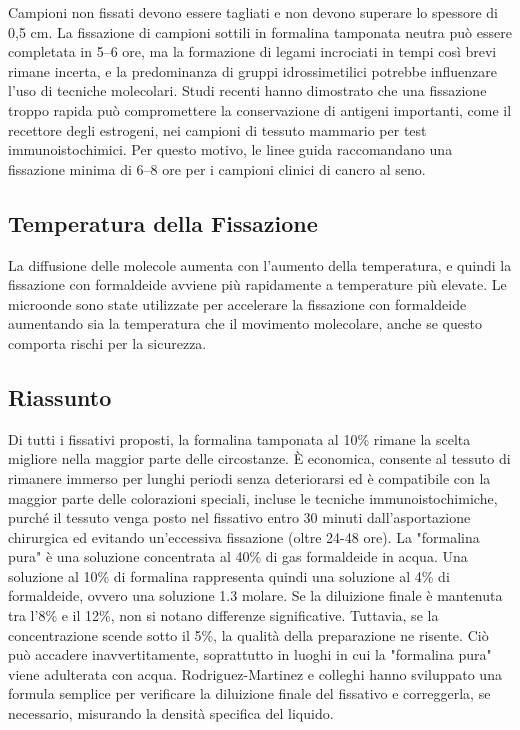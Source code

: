 Campioni non fissati devono essere tagliati e non devono superare lo spessore di 0,5 cm. La fissazione di campioni sottili in formalina tamponata neutra può essere completata in 5–6 ore, ma la formazione di legami incrociati in tempi così brevi rimane incerta, e la predominanza di gruppi idrossimetilici potrebbe influenzare l'uso di tecniche molecolari. Studi recenti hanno dimostrato che una fissazione troppo rapida può compromettere la conservazione di antigeni importanti, come il recettore degli estrogeni, nei campioni di tessuto mammario per test immunoistochimici. Per questo motivo, le linee guida raccomandano una fissazione minima di 6–8 ore per i campioni clinici di cancro al seno.

\subsection{Temperatura della Fissazione}
La diffusione delle molecole aumenta con l'aumento della temperatura, e quindi la fissazione con formaldeide avviene più rapidamente a temperature più elevate. Le microonde sono state utilizzate per accelerare la fissazione con formaldeide aumentando sia la temperatura che il movimento molecolare, anche se questo comporta rischi per la sicurezza.

\subsection {Riassunto} 


Di tutti i fissativi proposti, la formalina tamponata al 10\% rimane la scelta migliore nella maggior parte delle circostanze. È economica, consente al tessuto di rimanere immerso per lunghi periodi senza deteriorarsi ed è compatibile con la maggior parte delle colorazioni speciali, incluse le tecniche immunoistochimiche, purché il tessuto venga posto nel fissativo entro 30 minuti dall'asportazione chirurgica ed evitando un’eccessiva fissazione (oltre 24-48 ore). La "formalina pura" è una soluzione concentrata al 40\% di gas formaldeide in acqua. Una soluzione al 10\% di formalina rappresenta quindi una soluzione al 4\% di formaldeide, ovvero una soluzione 1.3 molare. Se la diluizione finale è mantenuta tra l'8\% e il 12\%, non si notano differenze significative. Tuttavia, se la concentrazione scende sotto il 5\%, la qualità della preparazione ne risente. Ciò può accadere inavvertitamente, soprattutto in luoghi in cui la "formalina pura" viene adulterata con acqua. Rodriguez-Martinez e colleghi hanno sviluppato una formula semplice per verificare la diluizione finale del fissativo e correggerla, se necessario, misurando la densità specifica del liquido.

